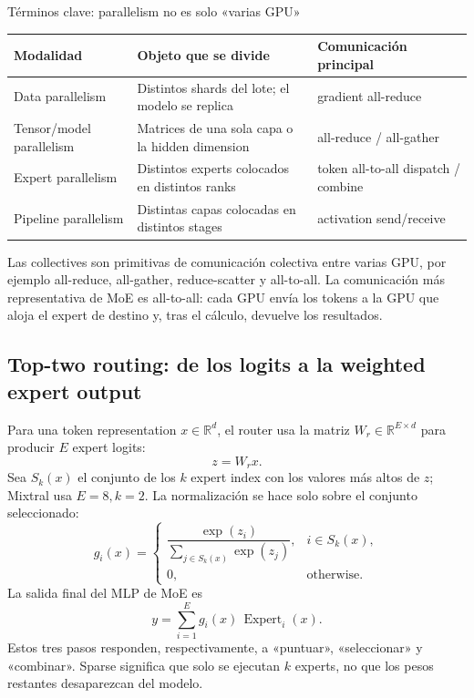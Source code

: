 \begin{knowledgebox}{Términos clave: parallelism no es solo «varias GPU»}
\begin{tabularx}{\textwidth}{L{0.19\textwidth} L{0.27\textwidth} X}
\toprule
Modalidad & Objeto que se divide & Comunicación principal \\
\midrule
Data parallelism & Distintos shards del lote; el modelo se replica & gradient all-reduce \\
Tensor/model parallelism & Matrices de una sola capa o la hidden dimension & all-reduce / all-gather \\
Expert parallelism & Distintos experts colocados en distintos ranks & token all-to-all dispatch / combine \\
Pipeline parallelism & Distintas capas colocadas en distintos stages & activation send/receive \\
\bottomrule
\end{tabularx}
Las collectives son primitivas de comunicación colectiva entre varias GPU, por ejemplo all-reduce, all-gather, reduce-scatter y all-to-all. La comunicación más representativa de MoE es all-to-all: cada GPU envía los tokens a la GPU que aloja el expert de destino y, tras el cálculo, devuelve los resultados.
\end{knowledgebox}


\subsection{Top-two routing: de los logits a la weighted expert output}

Para una token representation $x\in\mathbb{R}^{d}$, el router usa la matriz $W_r\in\mathbb{R}^{E\times d}$ para producir $E$ expert logits:
\[
z=W_rx.
\]
Sea $S_k(x)$ el conjunto de los $k$ expert index con los valores más altos de $z$; Mixtral usa $E=8,k=2$. La normalización se hace solo sobre el conjunto seleccionado:
\[
g_i(x)=
\begin{cases}
\dfrac{\exp(z_i)}{\sum_{j\in S_k(x)}\exp(z_j)}, & i\in S_k(x),\\[0.8em]
0, & \text{otherwise}.
\end{cases}
\]
La salida final del MLP de MoE es
\[
y=\sum_{i=1}^{E}g_i(x)\,\operatorname{Expert}_i(x).
\]
Estos tres pasos responden, respectivamente, a «puntuar», «seleccionar» y «combinar». Sparse significa que solo se ejecutan $k$ experts, no que los pesos restantes desaparezcan del modelo.

